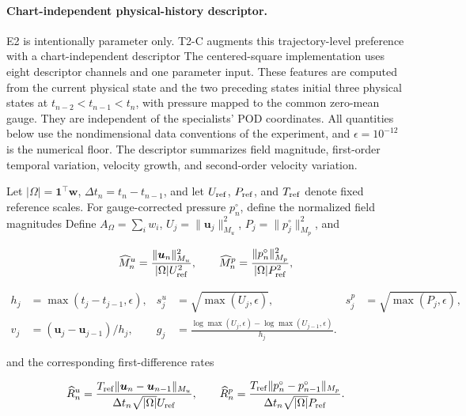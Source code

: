 \documentclass{article}
\providecommand{\DIFaddtex}[1]{{\protect\color{blue} \sf #1}} %
\providecommand{\DIFdeltex}[1]{{\protect\color{red} \scriptsize #1}} %
\providecommand{\DIFaddbegin}{} %
\providecommand{\DIFaddend}{} %
\providecommand{\DIFdelbegin}{} %
\providecommand{\DIFdelend}{} %
\providecommand{\DIFadd}[1]{\texorpdfstring{\DIFaddtex{#1}}{#1}} %
\providecommand{\DIFdel}[1]{\texorpdfstring{\DIFdeltex{#1}}{}} %
\begin{document}
\paragraph{Chart-independent physical-history descriptor.}
\DIFdelbegin \DIFdel{E2 is intentionally parameter only. T2-C augments this trajectory-level preference with a chart-independent
descriptor }\DIFdelend \DIFaddbegin \DIFadd{The centered-square implementation uses eight descriptor channels and one parameter input. These features are }\DIFaddend computed from the \DIFdelbegin \DIFdel{current physical state and the two preceding
states }\DIFdelend \DIFaddbegin \DIFadd{initial three physical states at $t_{n-2}<t_{n-1}<t_n$, with pressure mapped to the common zero-mean gauge. They are independent of the specialists' POD coordinates. All quantities below use the nondimensional data conventions of the experiment, and $\epsilon=10^{-12}$ is the numerical floor}\DIFaddend .
\DIFdelbegin \DIFdel{The descriptor summarizes field magnitude, first-order temporal variation,
velocity growth, and second-order velocity variation.
}\DIFdelend 

\DIFdelbegin \DIFdel{Let
$|\Omega|=\bm 1^\top\bm w$, $\Delta t_n=t_n-t_{n-1}$, and let $U_{\rm ref}$, $P_{\rm ref}$, and
$T_{\rm ref}$ denote fixed
reference scales.
For gauge-corrected pressure $p_n^\circ$, define the normalized field
magnitudes
}\DIFdelend \DIFaddbegin \DIFadd{Define $A_\Omega=\sum_i w_i$, $U_j=\|\bm u_j\|_{M_u}^2$, $P_j=\|p_j^\circ\|_{M_p}^2$, and
}\DIFaddend 


\DIFdelbegin 
{\color{red}
\begin{equation}
  \widehat M_n^u
  =
  \frac{
    \|\bm u_n\|_{M_u}^2
  }{
    |\Omega|U_{\rm ref}^2
  },
  \qquad
  \widehat M_n^p
  =
  \frac{
    \|p_n^\circ\|_{M_p}^2
  }{
    |\Omega|P_{\rm ref}^2
  },
  \label{old:eq:app_t2c_magnitude}
\end{equation}
}
\DIFdelend \DIFaddbegin 
{\color{blue}
\begin{align}
 h_j&=\max(t_j-t_{j-1},\epsilon),&
 s_j^u&=\sqrt{\max(U_j,\epsilon)},&
 s_j^p&=\sqrt{\max(P_j,\epsilon)},\\
 v_j&=(\bm u_j-\bm u_{j-1})/h_j,&
 g_j&=\frac{\log\max(U_j,\epsilon)-\log\max(U_{j-1},\epsilon)}{h_j}.
\end{align}
}
\DIFaddend 


\DIFdelbegin \DIFdel{and the corresponding first-difference rates
}%


{\color{red}
\begin{equation}
  \widehat R_n^u
  =
  \frac{
    T_{\rm ref}
    \|\bm u_n-\bm u_{n-1}\|_{M_u}
  }{
    \Delta t_n\sqrt{|\Omega|}U_{\rm ref}
  },
  \qquad
  \widehat R_n^p
  =
  \frac{
    T_{\rm ref}
    \|p_n^\circ-p_{n-1}^\circ\|_{M_p}
  }{
    \Delta t_n\sqrt{|\Omega|}P_{\rm ref}
  }.
  \label{old:eq:app_t2c_rate}
\end{equation}
}
\end{document}
